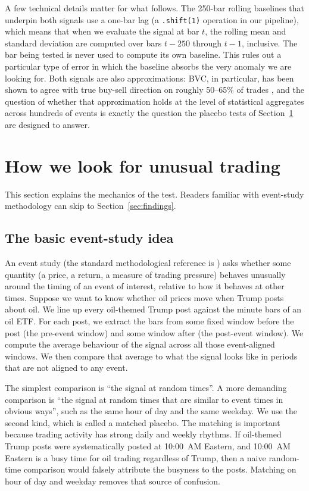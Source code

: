 \documentclass[11pt,a4paper]{article}
\begin{document}
A few technical details matter for what follows. The 250-bar rolling baselines that underpin both signals use a one-bar lag (a \texttt{.shift(1)} operation in our pipeline), which means that when we evaluate the signal at bar $t$, the rolling mean and standard deviation are computed over bars $t-250$ through $t-1$, inclusive. The bar being tested is never used to compute its own baseline. This rules out a particular type of error in which the baseline absorbs the very anomaly we are looking for. Both signals are also approximations: BVC, in particular, has been shown to agree with true buy-sell direction on roughly 50--65\% of trades \citep{chakrabarty2015,poppe2016}, and the question of whether that approximation holds at the level of statistical aggregates across hundreds of events is exactly the question the placebo tests of Section~\ref{sec:methods} are designed to answer.

\section{How we look for unusual trading}\label{sec:methods}

This section explains the mechanics of the test. Readers familiar with event-study methodology can skip to Section~\ref{sec:findings}.

\subsection{The basic event-study idea}

An event study (the standard methodological reference is \citealt{mackinlay1997}) asks whether some quantity (a price, a return, a measure of trading pressure) behaves unusually around the timing of an event of interest, relative to how it behaves at other times. Suppose we want to know whether oil prices move when Trump posts about oil. We line up every oil-themed Trump post against the minute bars of an oil ETF. For each post, we extract the bars from some fixed window before the post (the pre-event window) and some window after (the post-event window). We compute the average behaviour of the signal across all those event-aligned windows. We then compare that average to what the signal looks like in periods that are not aligned to any event.

The simplest comparison is ``the signal at random times''. A more demanding comparison is ``the signal at random times that are similar to event times in obvious ways'', such as the same hour of day and the same weekday. We use the second kind, which is called a matched placebo. The matching is important because trading activity has strong daily and weekly rhythms. If oil-themed Trump posts were systematically posted at 10:00~AM Eastern, and 10:00~AM Eastern is a busy time for oil trading regardless of Trump, then a naive random-time comparison would falsely attribute the busyness to the posts. Matching on hour of day and weekday removes that source of confusion.
\end{document}
